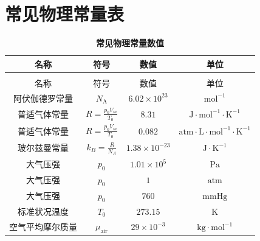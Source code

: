 \documentclass[zihao=-4,UTF8]{report}
\begin{document}
\newpage
\nocite{*}



\newpage
\appendix
{}
\titleformat{\subsection}{\normalsize\bfseries}{\thesubsection}{1em}{}

\section{常见物理常量表}
\begin{longtable}[H]{cccc}
    \caption{\textbf{常见物理常量数值}}\\
    \toprule
    名称 & 符号&  数值& 单位\\
    \midrule
    \endfirsthead
    \bottomrule
    \endfoot

    \toprule
    \multicolumn{4}{c}{\textbf{续上表}}\\
    \midrule
    名称 & 符号&  数值& 单位\\
    \midrule
    \endhead
    \bottomrule
    \endlastfoot
    阿伏伽德罗常量& $N_\text{A}$ & $6.02\times 10^{23}  $ & $\mathrm{mol}^{-1}$\\
    普适气体常量& $R=\frac{p_0V_m}{T_0} $& $8.31$& $\mathrm{J\cdot mol^{-1} \cdot K^{-1}}$\\
    普适气体常量& $R=\frac{p_0V_m}{T_0} $& $0.082$& $\mathrm{atm\cdot L\cdot mol^{-1} \cdot K^{-1}}$\\ 
    玻尔兹曼常量& $k_B=\frac{R}{N_A} $& $1.38\times10^{-23}$& $\mathrm{J\cdot K^{-1}}$\\
    大气压强& $p_0$& $1.01\times 10^5$& $\mathrm{Pa}$\\
    大气压强& $p_0$& $1$& $\mathrm{atm}$\\
    大气压强& $p_0$& $760$& $\mathrm{mmHg}$\\
    标准状况温度& $T_0$& $273.15$& $\mathrm{K}$\\
    空气平均摩尔质量& $\mu_{\text{air}}$& $29\times 10^{-3}$& $\mathrm{kg\cdot mol^{-1}}$
\end{longtable}
\end{document}
